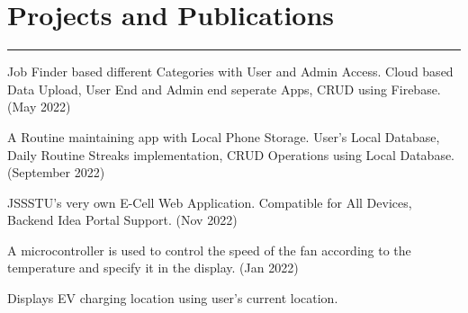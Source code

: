 \documentclass[]{rahulworld-resume}
\begin{document}
\begin{minipage}[t]{0.66\textwidth}
\section{Projects and Publications}
\noindent\rule{12.5cm}{0.4pt}
\noindent
\hspace{5em}%
\begin{minipage}{0.85\textwidth\vspace{5pt}}
Job Finder based different Categories with User and Admin Access. Cloud based Data Upload, User End and Admin end seperate Apps, CRUD using Firebase. (May 2022)
\end{minipage}
\noindent
\hspace{5em}%
\begin{minipage}{0.85\textwidth\vspace{5pt}}
A Routine maintaining app with Local Phone Storage. User's Local Database, Daily Routine Streaks implementation, CRUD Operations using Local Database. (September 2022)
\end{minipage}
\noindent
\hspace{5em}%
\begin{minipage}{0.85\textwidth\vspace{5pt}}
JSSSTU's very own E-Cell Web Application. Compatible for All Devices, Backend Idea Portal Support. (Nov 2022)
\end{minipage}
\noindent
\hspace{5em}%
\begin{minipage}{0.85\textwidth\vspace{5pt}}
A microcontroller is used to control the speed of the fan according to the temperature and specify it in the display. (Jan 2022)
\end{minipage}
\noindent
\hspace{5em}%
\begin{minipage}{0.85\textwidth\vspace{5pt}}
Displays EV charging location using user's current location.

\end{minipage}
\end{minipage}
\end{document}
